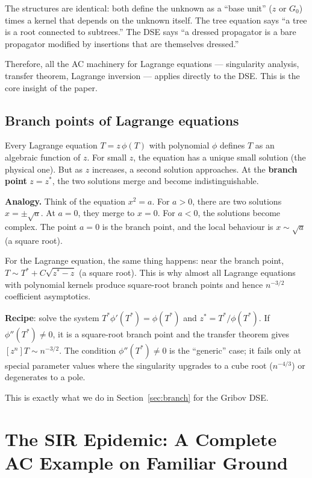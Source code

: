 \documentclass[11pt,a4paper]{article}
\theoremstyle{definition}
\begin{document}
The structures are identical: both define the unknown as a ``base unit''
($z$ or $G_0$) times a kernel that depends on the unknown itself. The
tree equation says ``a tree is a root connected to subtrees.'' The DSE
says ``a dressed propagator is a bare propagator modified by insertions
that are themselves dressed.''

Therefore, all the AC machinery for Lagrange equations ---
singularity analysis, transfer theorem, Lagrange inversion ---
applies directly to the DSE. This is the core insight of the paper.

\subsection{Branch points of Lagrange equations}

Every Lagrange equation $T = z\,\phi(T)$ with polynomial $\phi$ defines
$T$ as an algebraic function of $z$. For small $z$, the equation has a
unique small solution (the physical one). But as $z$ increases, a second
solution approaches. At the \textbf{branch point} $z = z^*$, the two
solutions merge and become indistinguishable.

\textbf{Analogy.} Think of the equation $x^2 = a$. For $a > 0$, there
are two solutions $x = \pm\sqrt{a}$. At $a = 0$, they merge to
$x = 0$. For $a < 0$, the solutions become complex. The point $a = 0$
is the branch point, and the local behaviour is $x \sim \sqrt{a}$
(a square root).

For the Lagrange equation, the same thing happens: near the branch point,
$T \sim T^* + C\sqrt{z^* - z}$ (a square root). This is why almost all
Lagrange equations with polynomial kernels produce square-root branch
points and hence $n^{-3/2}$ coefficient asymptotics.

\textbf{Recipe}: solve the system $T^*\phi'(T^*) = \phi(T^*)$ and
$z^* = T^*/\phi(T^*)$. If $\phi''(T^*) \neq 0$, it is a square-root
branch point and the transfer theorem gives $[z^n]T \sim n^{-3/2}$.
The condition $\phi''(T^*) \neq 0$ is the ``generic'' case; it fails
only at special parameter values where the singularity upgrades to a
cube root ($n^{-4/3}$) or degenerates to a pole.

This is exactly what we do in Section~\ref{sec:branch} for the Gribov DSE.

\section{The SIR Epidemic: A Complete AC Example on Familiar Ground}
\label{app:sir}
\end{document}

